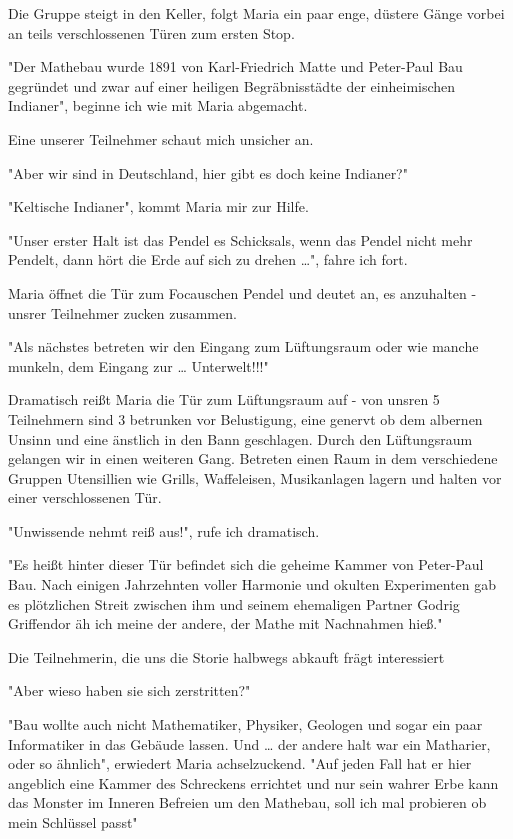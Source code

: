 \documentclass[11pt]{article}
\begin{document}
\noindent Die Gruppe steigt in den Keller, folgt Maria ein paar enge,
düstere Gänge vorbei an teils verschlossenen Türen zum ersten Stop.
\begin{center}
"Der Mathebau wurde 1891 von Karl-Friedrich Matte und Peter-Paul Bau
gegründet und zwar auf einer heiligen Begräbnisstädte der
einheimischen Indianer", beginne ich wie mit Maria abgemacht. 
\end{center}
Eine unserer Teilnehmer schaut mich unsicher an.
\begin{center}
"Aber wir sind in Deutschland, hier gibt es doch keine Indianer?"
\end{center}
\begin{center}
"Keltische Indianer", kommt Maria mir zur Hilfe.
\end{center}
\begin{center}
"Unser erster Halt ist das Pendel es Schicksals, wenn das Pendel nicht
mehr Pendelt, dann hört die Erde auf sich zu drehen \ldots{}", fahre ich fort.
\end{center}
Maria öffnet die Tür zum Focauschen Pendel und deutet an, es
anzuhalten - unsrer Teilnehmer zucken zusammen.
\begin{center}
"Als nächstes betreten wir den Eingang zum Lüftungsraum oder wie
manche munkeln, dem Eingang zur \ldots{} Unterwelt!!!"
\end{center}
Dramatisch reißt Maria die Tür zum Lüftungsraum auf - von unsren 5
Teilnehmern sind 3 betrunken vor Belustigung, eine genervt ob dem
albernen Unsinn und eine änstlich in den Bann geschlagen. Durch den
Lüftungsraum gelangen wir in einen weiteren Gang. Betreten einen Raum
in dem verschiedene Gruppen Utensillien wie Grills, Waffeleisen,
Musikanlagen lagern und halten vor einer verschlossenen Tür.
\begin{center}
"Unwissende nehmt reiß aus!", rufe ich dramatisch.
\end{center}
\begin{center}
"Es heißt hinter dieser Tür befindet sich die geheime Kammer von
Peter-Paul Bau. Nach einigen Jahrzehnten voller Harmonie und okulten
Experimenten gab es plötzlichen Streit zwischen ihm und seinem
ehemaligen Partner Godrig Griffendor äh ich meine der andere, der
Mathe mit Nachnahmen hieß."
\end{center}
Die Teilnehmerin, die uns die Storie halbwegs abkauft frägt
interessiert
\begin{center}
"Aber wieso haben sie sich zerstritten?"
\end{center}
\begin{center}
"Bau wollte auch nicht Mathematiker, Physiker, Geologen und sogar ein
paar Informatiker in das Gebäude lassen. Und \ldots{} der andere halt war
ein Matharier, oder so ähnlich", erwiedert Maria achselzuckend.
"Auf jeden Fall hat er hier angeblich eine
Kammer des Schreckens errichtet und nur sein wahrer Erbe kann das
Monster im Inneren Befreien um den Mathebau, soll ich mal probieren ob
mein Schlüssel passt"
\end{center}
\end{document}
